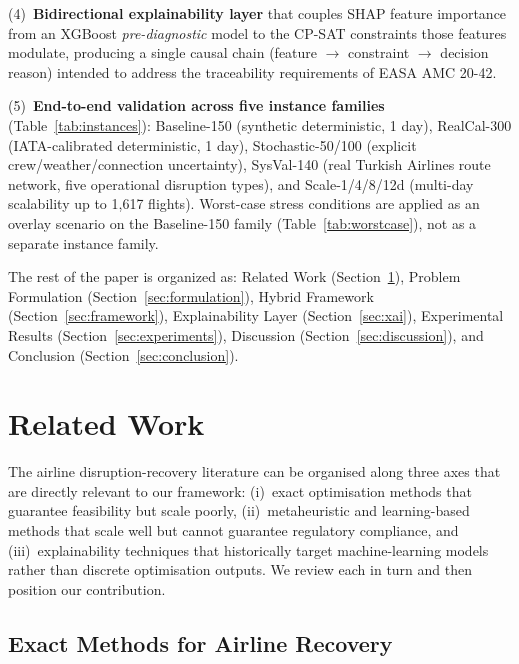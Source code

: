 \documentclass[12pt,number]{elsarticle}
\begin{document}
(4)~\textbf{Bidirectional explainability layer} that couples SHAP feature importance from an XGBoost \emph{pre-diagnostic} model to the CP-SAT constraints those features modulate, producing a single causal chain (feature $\rightarrow$ constraint $\rightarrow$ decision reason) intended to address the traceability requirements of EASA AMC 20-42.

(5)~\textbf{End-to-end validation across five instance families} (Table~\ref{tab:instances}): Baseline-150 (synthetic deterministic, 1 day), RealCal-300 (IATA-calibrated deterministic, 1 day), Stochastic-50/100 (explicit crew/weather/connection uncertainty), SysVal-140 (real Turkish Airlines route network, five operational disruption types), and Scale-1/4/8/12d (multi-day scalability up to 1{,}617 flights). Worst-case stress conditions are applied as an overlay scenario on the Baseline-150 family (Table~\ref{tab:worstcase}), not as a separate instance family.

The rest of the paper is organized as: Related Work (Section~\ref{sec:related}), Problem Formulation (Section~\ref{sec:formulation}), Hybrid Framework (Section~\ref{sec:framework}), Explainability Layer (Section~\ref{sec:xai}), Experimental Results (Section~\ref{sec:experiments}), Discussion (Section~\ref{sec:discussion}), and Conclusion (Section~\ref{sec:conclusion}).


\section{Related Work}
\label{sec:related}

The airline disruption-recovery literature can be organised along three axes that are directly relevant to our framework: (i)~exact optimisation methods that guarantee feasibility but scale poorly, (ii)~metaheuristic and learning-based methods that scale well but cannot guarantee regulatory compliance, and (iii)~explainability techniques that historically target machine-learning models rather than discrete optimisation outputs. We review each in turn and then position our contribution.

\subsection{Exact Methods for Airline Recovery}
\end{document}
